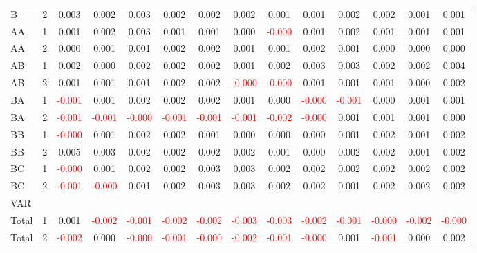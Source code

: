 \begin{table}[!htb]
{\begin{tabular}{llcccccccccccc}
B & 2 & 0.003 & 0.002 & 0.003 & 0.002 & 0.002 & 0.002 & 0.001 & 0.001 & 0.002 & 0.002 & 0.001 & 0.001\\
AA & 1 & 0.001 & 0.002 & 0.003 & 0.001 & 0.001 & 0.000 & \textcolor{red}{-0.000} & 0.001 & 0.002 & 0.001 & 0.001 & 0.001\\
AA & 2 & 0.000 & 0.001 & 0.001 & 0.002 & 0.002 & 0.001 & 0.001 & 0.002 & 0.001 & 0.000 & 0.000 & 0.000\\
AB & 1 & 0.002 & 0.000 & 0.002 & 0.002 & 0.002 & 0.001 & 0.002 & 0.003 & 0.003 & 0.002 & 0.002 & 0.004\\
AB & 2 & 0.001 & 0.001 & 0.001 & 0.002 & 0.002 & \textcolor{red}{-0.000} & \textcolor{red}{-0.000} & 0.001 & 0.001 & 0.001 & 0.000 & 0.002\\
BA & 1 & \textcolor{red}{-0.001} & 0.001 & 0.002 & 0.002 & 0.002 & 0.001 & 0.000 & \textcolor{red}{-0.000} & \textcolor{red}{-0.001} & 0.000 & 0.001 & 0.001\\
BA & 2 & \textcolor{red}{-0.001} & \textcolor{red}{-0.001} & \textcolor{red}{-0.000} & \textcolor{red}{-0.001} & \textcolor{red}{-0.001} & \textcolor{red}{-0.001} & \textcolor{red}{-0.002} & \textcolor{red}{-0.000} & 0.001 & 0.001 & 0.001 & 0.000\\
BB & 1 & \textcolor{red}{-0.000} & 0.001 & 0.002 & 0.002 & 0.001 & 0.000 & 0.000 & 0.000 & 0.001 & 0.002 & 0.001 & 0.002\\
BB & 2 & 0.005 & 0.003 & 0.002 & 0.002 & 0.002 & 0.002 & 0.001 & 0.000 & 0.002 & 0.002 & 0.001 & 0.002\\
BC & 1 & \textcolor{red}{-0.000} & 0.001 & 0.002 & 0.002 & 0.003 & 0.003 & 0.002 & 0.002 & 0.002 & 0.002 & 0.002 & 0.002\\
BC & 2 & \textcolor{red}{-0.001} & \textcolor{red}{-0.000} & 0.001 & 0.002 & 0.003 & 0.003 & 0.002 & 0.002 & 0.001 & 0.002 & 0.002 & 0.002\\
\hline
VAR &  &  &  &  &  &  &  &  &  &  &  &  & \\
\hline
Total & 1 & 0.001 & \textcolor{red}{-0.002} & \textcolor{red}{-0.001} & \textcolor{red}{-0.002} & \textcolor{red}{-0.002} & \textcolor{red}{-0.003} & \textcolor{red}{-0.003} & \textcolor{red}{-0.002} & \textcolor{red}{-0.001} & \textcolor{red}{-0.000} & \textcolor{red}{-0.002} & \textcolor{red}{-0.000}\\
Total & 2 & \textcolor{red}{-0.002} & 0.000 & \textcolor{red}{-0.000} & \textcolor{red}{-0.001} & \textcolor{red}{-0.000} & \textcolor{red}{-0.002} & \textcolor{red}{-0.001} & \textcolor{red}{-0.000} & 0.001 & \textcolor{red}{-0.001} & 0.000 & 0.002\\

\end{tabular}}
\end{table}
